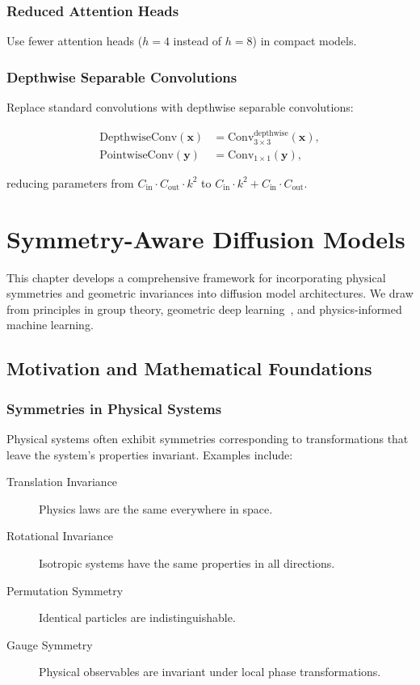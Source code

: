 \documentclass[12pt]{report}
\theoremstyle{definition}
\begin{document}
\subsection{Reduced Attention Heads}

Use fewer attention heads ($h = 4$ instead of $h = 8$) in compact models.

\subsection{Depthwise Separable Convolutions}

Replace standard convolutions with depthwise separable convolutions:

\begin{align}
\text{DepthwiseConv}(\mathbf{x}) &= \text{Conv}_{3 \times 3}^{\text{depthwise}}(\mathbf{x}), \label{eq:depthwise} \\
\text{PointwiseConv}(\mathbf{y}) &= \text{Conv}_{1 \times 1}(\mathbf{y}), \label{eq:pointwise}
\end{align}

reducing parameters from $C_{\text{in}} \cdot C_{\text{out}} \cdot k^2$ to $C_{\text{in}} \cdot k^2 + C_{\text{in}} \cdot C_{\text{out}}$.

\chapter{Symmetry-Aware Diffusion Models}

This chapter develops a comprehensive framework for incorporating physical symmetries and geometric invariances into diffusion model architectures. We draw from principles in group theory, geometric deep learning~\citep{bronstein2021geometric}, and physics-informed machine learning.

\section{Motivation and Mathematical Foundations}

\subsection{Symmetries in Physical Systems}

Physical systems often exhibit symmetries corresponding to transformations that leave the system's properties invariant. Examples include:

\begin{description}
\item[Translation Invariance] Physics laws are the same everywhere in space.
\item[Rotational Invariance] Isotropic systems have the same properties in all directions.
\item[Permutation Symmetry] Identical particles are indistinguishable.
\item[Gauge Symmetry] Physical observables are invariant under local phase transformations.
\end{description}
\end{document}
